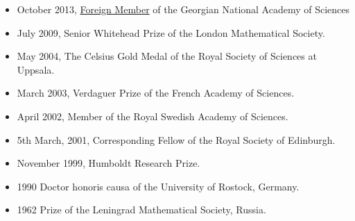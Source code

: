 \documentclass{article}
\begin{document}
\begin{itemize}
    
 \item October 2013, 
  \href{http://www.science.org.ge/Documents/Diploma/Mazya.pdf}
  {Foreign Member}
  of the Georgian National Academy of Sciences
  \item July 2009, 
                        {Senior Whitehead Prize of the London Mathematical Society}.
\item May 2004, The Celsius Gold Medal of the Royal Society of Sciences at Uppsala.

 \item  March 2003, Verdaguer Prize  of the
French Academy of Sciences.
\item April 2002, Member of the Royal
Swedish Academy of Sciences.
       \item 5th March, 2001, Corresponding
Fellow of the Royal Society of 
  Edinburgh.
       \item November 1999, Humboldt Research
Prize.
        \item 1990 Doctor honoris causa of the
University of Rostock, Germany.
       \item 1962 Prize of the Leningrad
Mathematical Society, Russia.
\end{itemize}

\medskip
\end{document}
